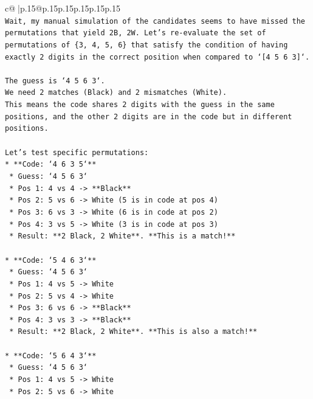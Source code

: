 \documentclass{article}
\begin{document}
{\begin{supertabular}{c@{$\;$}|p{.15\linewidth}@{}p{.15\linewidth}p{.15\linewidth}p{.15\linewidth}p{.15\linewidth}p{.15\linewidth}}
{{{\\ 
\texttt{Wait, my manual simulation of the candidates seems to have missed the permutations that yield 2B, 2W. Let's re{-}evaluate the set of permutations of \{3, 4, 5, 6\} that satisfy the condition of having exactly 2 digits in the correct position when compared to `{[}4 5 6 3{]}`.} \\
\\ 
\texttt{The guess is `4 5 6 3`.} \\
\texttt{We need 2 matches (Black) and 2 mismatches (White).} \\
\texttt{This means the code shares 2 digits with the guess in the same positions, and the other 2 digits are in the code but in different positions.} \\
\\ 
\texttt{Let's test specific permutations:} \\
\texttt{*   **Code: `4 6 3 5`**} \\
\texttt{    *   Guess: `4 5 6 3`} \\
\texttt{    *   Pos 1: 4 vs 4 {-}> **Black**} \\
\texttt{    *   Pos 2: 5 vs 6 {-}> White (5 is in code at pos 4)} \\
\texttt{    *   Pos 3: 6 vs 3 {-}> White (6 is in code at pos 2)} \\
\texttt{    *   Pos 4: 3 vs 5 {-}> White (3 is in code at pos 3)} \\
\texttt{    *   Result: **2 Black, 2 White**. **This is a match!**} \\
\\ 
\texttt{*   **Code: `5 4 6 3`**} \\
\texttt{    *   Guess: `4 5 6 3`} \\
\texttt{    *   Pos 1: 4 vs 5 {-}> White} \\
\texttt{    *   Pos 2: 5 vs 4 {-}> White} \\
\texttt{    *   Pos 3: 6 vs 6 {-}> **Black**} \\
\texttt{    *   Pos 4: 3 vs 3 {-}> **Black**} \\
\texttt{    *   Result: **2 Black, 2 White**. **This is also a match!**} \\
\\ 
\texttt{*   **Code: `5 6 4 3`**} \\
\texttt{    *   Guess: `4 5 6 3`} \\
\texttt{    *   Pos 1: 4 vs 5 {-}> White} \\
\texttt{    *   Pos 2: 5 vs 6 {-}> White} \\
}}}
\end{supertabular}}
\end{document}
